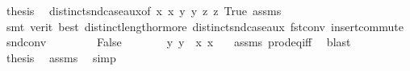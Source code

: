 \begin{isabellebody}
\ {\isacharquery}{\kern0pt}thesis\ \isamarkupfalse%
\ distinct{\isacharunderscore}{\kern0pt}snd{\isacharunderscore}{\kern0pt}case{\isacharunderscore}{\kern0pt}aux{\isacharbrackleft}{\kern0pt}of\ {\isachardoublequoteopen}{\isacharparenleft}{\kern0pt}x{}{\isacharcomma}{\kern0pt}\ x{}{\isacharparenright}{\kern0pt}{\isachardoublequoteclose}\ {\isachardoublequoteopen}{\isacharparenleft}{\kern0pt}y{}{\isacharcomma}{\kern0pt}\ y{}{\isacharparenright}{\kern0pt}{\isachardoublequoteclose}\ {\isachardoublequoteopen}{\isacharparenleft}{\kern0pt}z{}{\isacharcomma}{\kern0pt}\ z{}{\isacharparenright}{\kern0pt}{\isachardoublequoteclose}{\isacharbrackright}{\kern0pt}\ True\ assms\isanewline
\ \ \ \ \ \ \isamarkupfalse%
\ {\isacharparenleft}{\kern0pt}smt\ {\isacharparenleft}{\kern0pt}verit{\isacharcomma}{\kern0pt}\ best{\isacharparenright}{\kern0pt}\ distinct{\isacharunderscore}{\kern0pt}length{\isacharunderscore}{\kern0pt}{}{\isacharunderscore}{\kern0pt}or{\isacharunderscore}{\kern0pt}more\ distinct{\isacharunderscore}{\kern0pt}snd{\isacharunderscore}{\kern0pt}case{\isacharunderscore}{\kern0pt}aux\ fst{\isacharunderscore}{\kern0pt}conv\ insert{\isacharunderscore}{\kern0pt}commute\ snd{\isacharunderscore}{\kern0pt}conv{\isacharparenright}{\kern0pt}\isanewline
\ \ \isamarkupfalse%
\isanewline
\ \ \ \ \isamarkupfalse%
\ False\isanewline
\ \ \ \ \isamarkupfalse%
\ \isamarkupfalse%
\ {\isachardoublequoteopen}{\isacharparenleft}{\kern0pt}y{}{\isacharcomma}{\kern0pt}\ y{}{\isacharparenright}{\kern0pt}\ {\isacharequal}{\kern0pt}\ {\isacharparenleft}{\kern0pt}x{}{\isacharcomma}{\kern0pt}\ x{}{\isacharparenright}{\kern0pt}{\isachardoublequoteclose}\ \isamarkupfalse%
\ {\isachardoublequoteopen}{}{\isachardoublequoteclose}\ assms\ prod{\isacharunderscore}{\kern0pt}eq{\isacharunderscore}{\kern0pt}iff\ \isamarkupfalse%
\ blast\ \isanewline
\ \ \ \ \isamarkupfalse%
\ {\isacharquery}{\kern0pt}thesis\ \isamarkupfalse%
\ assms{\isacharparenleft}{\kern0pt}{}{\isacharparenright}{\kern0pt}\ \isamarkupfalse%
\ simp\isanewline
\ \ \isamarkupfalse%
\isanewline
{}\isamarkupfalse%
%
\endisatagproof
{\isafoldproof}%
%
\isadelimproof
\isanewline
%
\endisadelimproof
\isanewline
{}\isamarkupfalse%

\end{isabellebody}
